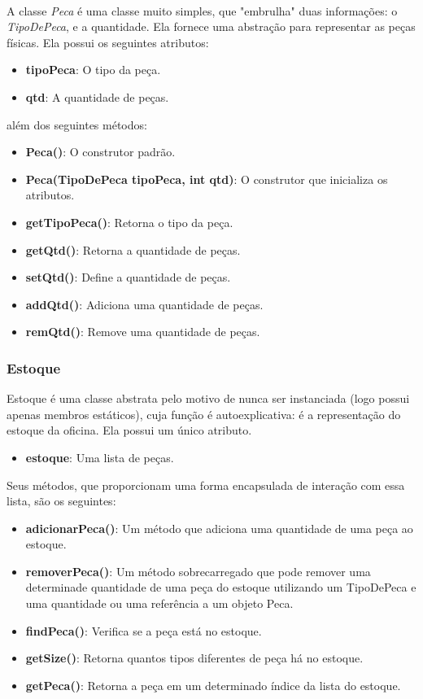 \documentclass[a4paper,12pt]{article}
\begin{document}
\paragraph{}
A classe \textit{Peca} é uma classe muito simples, que "embrulha" duas informações: o \textit{TipoDePeca}, e a quantidade. Ela fornece uma abstração para representar as peças físicas. Ela possui os seguintes atributos:
\begin{itemize}[noitemsep]
    \item \textbf{tipoPeca}: O tipo da peça.
    \item \textbf{qtd}: A quantidade de peças.
\end{itemize}

\noindent além dos seguintes métodos:
\begin{itemize}[noitemsep]
    \item \textbf{Peca()}: O construtor padrão.
    \item \textbf{Peca(TipoDePeca tipoPeca, int qtd)}: O construtor que inicializa os atributos.
    \item \textbf{getTipoPeca()}: Retorna o tipo da peça.
    \item \textbf{getQtd()}: Retorna a quantidade de peças.
    \item \textbf{setQtd()}: Define a quantidade de peças.
    \item \textbf{addQtd()}: Adiciona uma quantidade de peças.
    \item \textbf{remQtd()}: Remove uma quantidade de peças.
\end{itemize}

\subsubsection{Estoque}
Estoque é uma classe abstrata pelo motivo de nunca ser instanciada (logo possui apenas membros estáticos), cuja função é autoexplicativa: é a representação do estoque da oficina. Ela possui um único atributo.

\begin{itemize}[noitemsep]
    \item \textbf{estoque}: Uma lista de peças.
\end{itemize}

\noindent Seus métodos, que proporcionam uma forma encapsulada de interação com essa lista, são os seguintes:

\begin{itemize}[noitemsep]
    \item \textbf{adicionarPeca()}: Um método que adiciona uma quantidade de uma peça ao estoque.
    \item \textbf{removerPeca()}: Um método sobrecarregado que pode remover uma determinade quantidade de uma peça do estoque utilizando um TipoDePeca e uma quantidade ou uma referência a um objeto Peca.
    \item \textbf{findPeca()}: Verifica se a peça está no estoque.
    \item \textbf{getSize()}: Retorna quantos tipos diferentes de peça há no estoque.
    \item \textbf{getPeca()}: Retorna a peça em um determinado índice da lista do estoque. 
\end{itemize}
\end{document}
